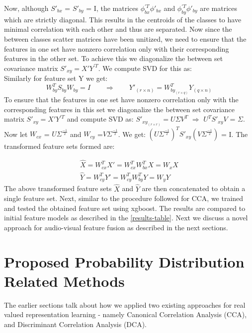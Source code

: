 \documentclass{article}
\begin{document}
Now, although $S'_{bx}$ = $S'_{by}$ = I, the matrices $\phi_{bx}^{'T} \phi'_{bx}$ and $\phi_{by}^{'T} \phi'_{by}$ are matrices which are strictly diagonal. This results in  the centroids of the classes to have minimal correlation with each other and thus are separated. Now since the between classes scatter matrices have been unitized, we need
to ensure that the features in one set have nonzero correlation only with
their corresponding features in the other set. To achieve this we
diagonalize the between set covariance matrix $S'_{xy}= X'Y^{'T}$. We compute SVD for this as:\\
\fi
Similarly for feature set Y we get:
\begin{equation*}
  W_{by}^T S_{by}W_{by} = I \qquad\text{$\Rightarrow$}\qquad Y'_{(r \times n)} = W_{by_{(r \times q)}}^TY_{(q \times n)} 
\end{equation*}
To ensure that the features in one set have nonzero correlation only with the corresponding features in this set we diagonalize the between set covariance matrix $S'_{xy}= X'Y^{'T}$ and compute SVD as: $S'_{xy_{(r \times r)}}= U\Sigma V^T$ $\Rightarrow$ $U^TS'_{xy}V$ = $\Sigma$. Now let $W_{cx}$ = $U\Sigma^{\frac{-1}{2}}$ and $W_{cy}$ =$V\Sigma^{\frac{-1}{2}}$. We get: $(U\Sigma^{\frac{-1}{2}})^T$$S'_{xy}$$(V\Sigma^{\frac{-1}{2}})$ = I. The transformed feature sets formed are:

\begin{gather*}
\hat{X} = W_{cx}^TX'= W_{cx}^TW_{bx}^TX = W_xX \\
\hat{Y} = W_{cy}^TY'= W_{cy}^TW_{by}^TY = W_yY 
\end{gather*}
The above transformed feature sets $\hat{X}$ and $\hat{Y}$ are then concatenated to obtain a single feature set. Next, similar to the procedure followed for CCA, we trained and tested  the obtained feature set using xgboost. The results are compared to initial feature models as described in the \ref{results-table}. Next we discuss a novel approach for audio-visual feature fusion as described in the next sections.

\section{Proposed Probability Distribution Related Methods}

The earlier sections talk about  how we applied two existing approaches for real valued representation learning - namely Canonical Correlation Analysis (CCA), and Discriminant Correlation Analysis (DCA).
\end{document}
